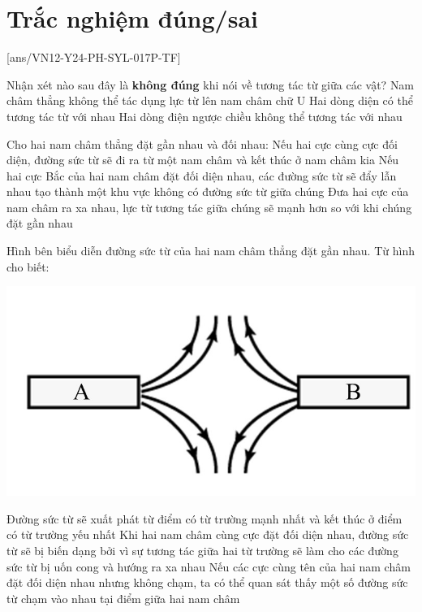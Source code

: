 
\section{Trắc nghiệm đúng/sai}
[ans/VN12-Y24-PH-SYL-017P-TF]
\setcounter{ex}{0}
\begin{ex}
	Nhận xét nào sau đây là \textbf{không đúng} khi nói về tương tác từ giữa các vật?
	{Nam châm thẳng không thể tác dụng lực từ lên nam châm chữ U}
	{\True Hai dòng diện có thể tương tác từ với nhau}
	{Hai dòng điện ngược chiều không thể tương tác với nhau}
	\loigiai{}
\end{ex}

\begin{ex}
	Cho hai nam châm thẳng đặt gần nhau và đối nhau:
	{Nếu hai cực cùng cực đối diện, đường sức từ sẽ đi ra từ một nam châm và kết thúc ở nam châm kia}
	{\True Nếu hai cực Bắc của hai nam châm đặt đối diện nhau, các đường sức từ sẽ đẩy lẫn nhau tạo thành một khu vực không có đường sức từ giữa chúng}
	{Đưa hai cực của nam châm ra xa nhau, lực từ tương tác giữa chúng sẽ mạnh hơn so với khi chúng đặt gần nhau}
	\loigiai{}
\end{ex}
\begin{ex}
	Hình bên biểu diễn đường sức từ của hai nam châm thẳng đặt gần nhau. Từ hình cho biết:
	\begin{center}
		\includegraphics[width=0.35\linewidth]{../figs/VN12-Y24-PH-SYL-017P-9}
	\end{center}
	{Đường sức từ sẽ xuất phát từ điểm có từ trường mạnh nhất và kết thúc ở điểm có từ trường yếu nhất}
	{\True Khi hai nam châm cùng cực đặt đối diện nhau, đường sức từ sẽ bị biến dạng bởi vì sự tương tác giữa hai từ trường sẽ làm cho các đường sức từ bị uốn cong và hướng ra xa nhau}
	{Nếu các cực cùng tên của hai nam châm đặt đối diện nhau nhưng không chạm, ta có thể quan sát thấy một số đường sức từ chạm vào nhau tại điểm giữa hai nam châm}
	
\end{ex}
